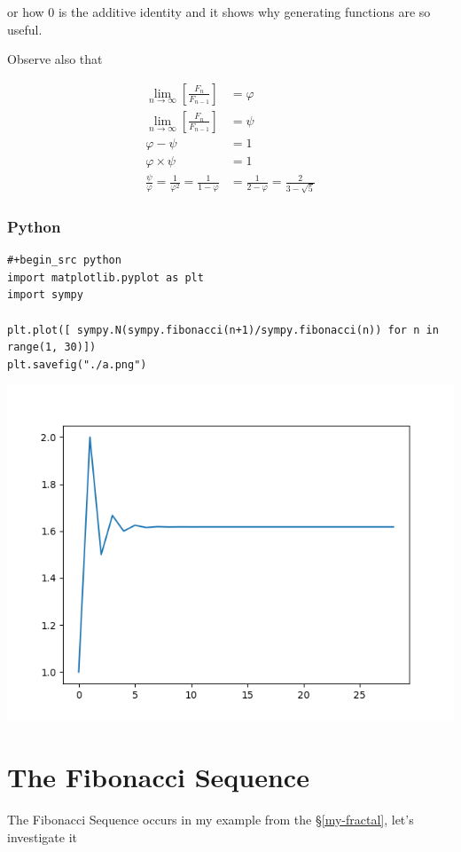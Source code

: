 \documentclass[a4paper,11pt,twoside]{article}
\begin{document}
or how 0 is the additive identity and it shows why generating functions
are so useful.

Observe also that

$$\begin{aligned}
\lim_{n     \rightarrow \infty }\left[ \frac{F_n}{F_{n- 1} }  \right] &= \varphi \\
\lim_{n     \rightarrow \infty }\left[ \frac{F_n}{F_{n- 1} }  \right] &= \psi \\
\varphi - \psi &=  1 \\
\varphi \times  \psi  &= 1 \\
\frac{\psi}{\varphi}  = \frac{1}{\varphi^2} = \frac{1}{1-\varphi} &= \frac{1}{2-\varphi} = \frac{2}{3 - \sqrt{5}  }
\end{aligned}$$
\subsubsection{Python}
\label{sec:org3dd2f48}

\begin{verbatim}
#+begin_src python
import matplotlib.pyplot as plt
import sympy

plt.plot([ sympy.N(sympy.fibonacci(n+1)/sympy.fibonacci(n)) for n in range(1, 30)])
plt.savefig("./a.png")
\end{verbatim}
\begin{center}
\includegraphics[width=.9\linewidth]{./a.png}
\end{center}

\section{The Fibonacci Sequence}
\label{sec:orgd287368}
The Fibonacci Sequence occurs in my example from the \S \ref{my-fractal}, let's investigate it
\end{document}
